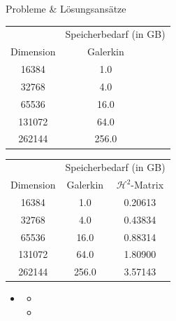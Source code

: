 \documentclass[10pt]{beamer}
\begin{document}
\begin{frame}{Probleme \& Lösungsansätze}
  \begin{overprint}
      \begin{table}[h]
        \begin{tabular}{ccc} \toprule
                    & \multicolumn{2}{c}{Speicherbedarf (in GB)} \\
          Dimension & Galerkin & \\ \midrule
              16384 &      1.0 & \\
              32768 &      4.0 & \\
              65536 &     16.0 & \\
             131072 &     64.0 & \\
             262144 &    256.0 & \\ \bottomrule
        \end{tabular}
      \end{table}
      \begin{table}[h]
        \begin{tabular}{ccc} \toprule
                    & \multicolumn{2}{c}{Speicherbedarf (in GB)} \\
          Dimension & Galerkin & \(\mathcal{H}^2\)-Matrix \\ \midrule
              16384 &      1.0 & 0.20613 \\
              32768 &      4.0 & 0.43834 \\
              65536 &     16.0 & 0.88314 \\
             131072 &     64.0 & 1.80900 \\
             262144 &    256.0 & 3.57143 \\ \bottomrule
        \end{tabular}
      \end{table}
  \end{overprint}

  \begin{itemize}
    \item {}
    \begin{itemize}
      \item {}
      \item {}
    \end{itemize}
  \end{itemize}
\end{frame}
\end{document}
